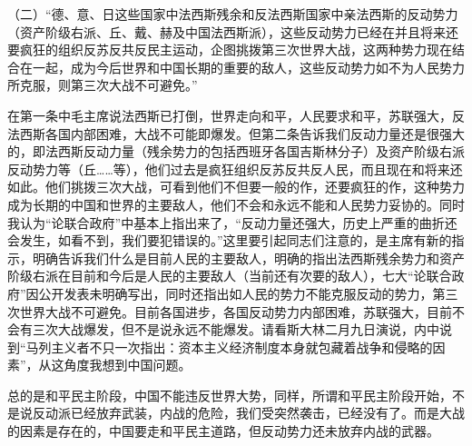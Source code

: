 （二）“德、意、日这些国家中法西斯残余和反法西斯国家中亲法西斯的反动势力（资产阶级右派、丘、戴、赫及中国法西斯派），这些反动势力已经在并且将来还要疯狂的组织反苏反共反民主运动，企图挑拨第三次世界大战，这两种势力现在结合在一起，成为今后世界和中国长期的重要的敌人，这些反动势力如不为人民势力所克服，则第三次大战不可避免。”

在第一条中毛主席说法西斯已打倒，世界走向和平，人民要求和平，苏联强大，反法西斯各国内部困难，大战不可能即爆发。但第二条告诉我们反动力量还是很强大的，即法西斯反动力量（残余势力的包括西班牙各国吉斯林分子）及资产阶级右派反动势力等（丘……等），他们过去是疯狂组织反苏反共反人民，而且现在和将来还如此。他们挑拨三次大战，可看到他们不但要一般的作，还要疯狂的作，这种势力成为长期的中国和世界的主要敌人，他们不会和永远不能和人民势力妥协的。同时我认为“论联合政府”中基本上指出来了，“反动力量还强大，历史上严重的曲折还会发生，如看不到，我们要犯错误的。”这里要引起同志们注意的，是主席有新的指示，明确告诉我们什么是目前人民的主要敌人，明确的指出法西斯残余势力和资产阶级右派在目前和今后是人民的主要敌人（当前还有次要的敌人），七大“论联合政府”因公开发表未明确写出，同时还指出如人民的势力不能克服反动的势力，第三次世界大战不可避免。目前各国进步，各国反动势力内部困难，苏联强大，目前不会有三次大战爆发，但不是说永远不能爆发。请看斯大林二月九日演说，内中说到“马列主义者不只一次指出：资本主义经济制度本身就包藏着战争和侵略的因素”，从这角度我想到中国问题。

总的是和平民主阶段，中国不能违反世界大势，同样，所谓和平民主阶段开始，不是说反动派已经放弃武装，内战的危险，我们受突然袭击，已经没有了。而是大战的因素是存在的，中国要走和平民主道路，但反动势力还未放弃内战的武器。

